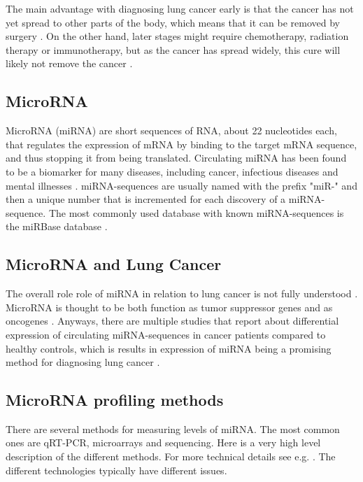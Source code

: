 The main advantage with diagnosing lung cancer early is that the cancer has not yet spread to other parts of the body, which means that it can be removed by surgery \citep{cancertreatment}. On the other hand, later stages might require chemotherapy, radiation therapy or immunotherapy, but as the cancer has spread widely, this cure will likely not remove the cancer \citep{cancertreatment}.


\subsection{MicroRNA}

MicroRNA (miRNA) are short sequences of RNA, about 22 nucleotides each, that regulates the expression of mRNA by binding to the target mRNA sequence, and thus stopping it from being translated. Circulating miRNA has been found to be a biomarker for many diseases, including cancer, infectious diseases and mental illnesses \citep{mirnabiomarker,mirnabiomarker2,mirnabiomarker3,mirnabiomarker4}. miRNA-sequences are usually named with the prefix "miR-" and then a unique number that is incremented for each discovery of a miRNA-sequence. The most commonly used database with known miRNA-sequences is the miRBase database \citep{mirbase}.

\subsection{MicroRNA and Lung Cancer}

The overall role role of miRNA in relation to lung cancer is not fully understood \citep{mirnarole}. MicroRNA is thought to be both function as tumor suppressor genes and as oncogenes \citep{mirnarole2}. Anyways, there are multiple studies that report about differential expression of circulating miRNA-sequences in cancer patients compared to healthy controls, which is results in expression of miRNA being a promising method for diagnosing lung cancer \citep{mirnarole}.

\subsection{MicroRNA profiling methods}

There are several methods for measuring levels of miRNA. The most common ones are qRT-PCR, microarrays and sequencing. Here is a very high level description of the different methods. For more technical details see e.g. \citet{mirnatech}. The different technologies typically have different issues.

